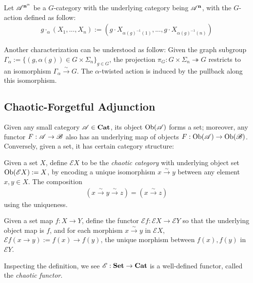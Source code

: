 \documentclass{article}
\begin{document}
\begin{defn}
    Let $\mathscr{A}^{\mathbf{n}^\alpha}$ be a $G$-category with the underlying category being $\mathscr{A}^\mathbf{n}$, with the $G$-action defined as follow:
    \begin{align*}
        g\cdot_\alpha (X_1,...,X_n):= (g\cdot X_{\alpha(g)^{-1}(1)},...,g\cdot X_{\alpha(g)^{-1}(n)})
    \end{align*}
\end{defn}
Another characterization can be understood as follow: Given the graph subgroup $\Gamma_\alpha:= \{(g,\alpha(g))\in G\times\Sigma_n\}_{g\in G}$, the projection $\pi_G:G\times\Sigma_n\twoheadrightarrow G$ restricts to an isomorphism $\Gamma_\alpha\xrightarrow{\sim}G$. The $\alpha$-twisted action is induced by the pullback along this isomorphism.

\hfil

\subsection{Chaotic-Forgetful Adjunction}\label{sub_chaot_adj}

Given any small category $\mathscr{A}\in\mathbf{Cat}$, its object $\mathrm{Ob}(\mathscr{A})$ forms a set; moreover, any functor $F:\mathscr{A}\rightarrow\mathscr{B}$ also has an underlying map of objects $F:\mathrm{Ob}(\mathscr{A})\rightarrow\mathrm{Ob}(\mathscr{B})$. Conversely, given a set, it has certain category structure:

\begin{defn}\label{defn_chaot}
    Given a set $X$, define $\mathscr{E}X$ to be the \emph{chaotic category} with underlying object set $\mathrm{Ob}(\mathscr{E}X):=X$, by encoding a unique isomorphism $x\xrightarrow{\sim} y$ between any element $x,y\in X$. The composition 
    \begin{align}
        (x\xrightarrow{\sim}y \xrightarrow{\sim}z) = (x\xrightarrow{\sim}z)
    \end{align}
    using the uniqueness.

    \hfil

    Given a set map $f:X\rightarrow Y$, define the functor $\mathscr{E}f:\mathscr{E}X\rightarrow\mathscr{E}Y$ so that the underlying object map is $f$, and for each morphism $x\xrightarrow{\sim}y$ in $\mathscr{E}X$, $\mathscr{E}f(x\rightarrow y):= f(x)\rightarrow f(y)$, the unique morphism between $f(x),f(y)$ in $\mathscr{E}Y$.
\end{defn}

Inspecting the definition, we see $\mathscr{E}:\mathbf{Set}\rightarrow\mathbf{Cat}$ is a well-defined functor, called the \emph{chaotic functor}.
\end{document}
